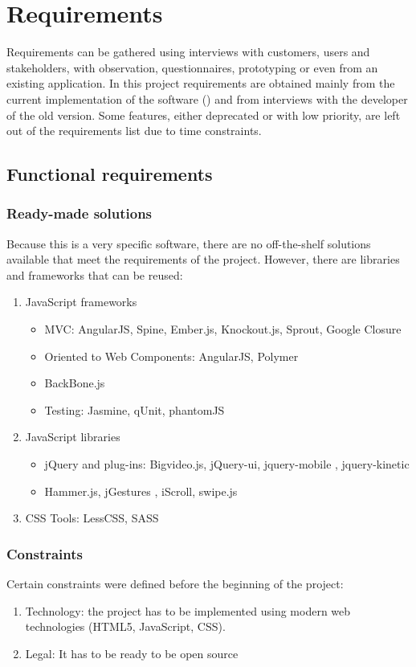 \chapter{Requirements}
Requirements can be gathered using interviews with customers, users and stakeholders, with observation, questionnaires, prototyping or even from an existing application.
In this project requirements are obtained mainly from the current implementation of the software () and from interviews with the developer of the old version.
Some features, either deprecated or with low priority, are left out of the requirements list due to time constraints. 

\section{Functional requirements}

\subsection*{Ready-made solutions}
Because this is a very specific software, there are no off-the-shelf solutions available that meet the requirements of the project.
However, there are libraries and frameworks that can be reused:

\begin{enumerate}
    \item JavaScript frameworks
    \begin{itemize}
        \item \ac{MVC}: AngularJS, Spine, Ember.js, Knockout.js, Sprout, Google Closure
        \item Oriented to Web Components: AngularJS, Polymer
        \item BackBone.js
    \item Testing: Jasmine, qUnit, phantomJS   
    \end{itemize}
    \item JavaScript libraries
    \begin{itemize}
        \item jQuery and plug-ins: Bigvideo.js, jQuery-ui, jquery-mobile , jquery-kinetic  
        \item Hammer.js, jGestures , iScroll, swipe.js
    \end{itemize} 
    \item \ac{CSS} Tools: LessCSS, SASS
\end{enumerate}

\subsection*{Constraints}
Certain constraints were defined before the beginning of the project:
\begin{enumerate}
    \item Technology: the project has to be implemented using modern web technologies (\ac{HTML5}, JavaScript, \ac{CSS}).
    \item Legal: It has to be ready to be open source
\end{enumerate}

